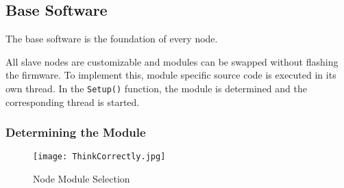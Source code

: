 \subsection{Base Software}
The base software is the foundation of every node. %

All slave nodes are customizable and modules can be swapped without flashing
the firmware. To implement this, module specific source code is executed in
its own thread. In the \texttt{Setup()} function, the module is determined
and the corresponding thread is started.

        \subsubsection{Determining the Module}

        \begin{figure}[H]
            \centering
            \texttt{[image: ThinkCorrectly.jpg]}
            \caption{Node Module Selection}
            \label{fig:NodeModuleSelection}
        \end{figure}
